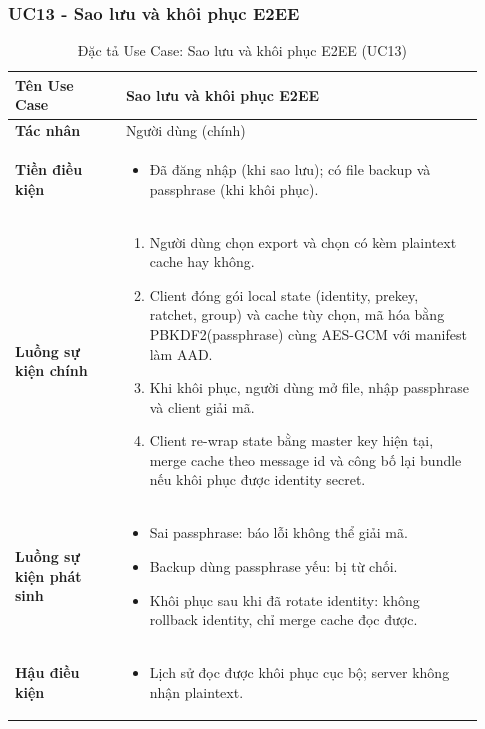 \subsubsection{UC13 - Sao lưu và khôi phục E2EE}

\begin{longtable}{|p{0.22\linewidth}|p{0.71\linewidth}|}
\caption{Đặc tả Use Case: Sao lưu và khôi phục E2EE (UC13)}\label{tab:uc13}\\
\hline
\textbf{Tên Use Case} & Sao lưu và khôi phục E2EE \\ \hline
\textbf{Tác nhân} & Người dùng (chính) \\ \hline
\textbf{Tiền điều kiện} &
\begin{itemize}
  \item Đã đăng nhập (khi sao lưu); có file backup và passphrase (khi khôi phục).
\end{itemize} \\ \hline
\textbf{Luồng sự kiện chính} &
\begin{enumerate}
  \item Người dùng chọn export và chọn có kèm plaintext cache hay không.
  \item Client đóng gói local state (identity, prekey, ratchet, group) và cache tùy chọn, mã hóa bằng PBKDF2(passphrase) cùng AES-GCM với manifest làm AAD.
  \item Khi khôi phục, người dùng mở file, nhập passphrase và client giải mã.
  \item Client re-wrap state bằng master key hiện tại, merge cache theo message id và công bố lại bundle nếu khôi phục được identity secret.
\end{enumerate} \\ \hline
\textbf{Luồng sự kiện phát sinh} &
\begin{itemize}
  \item Sai passphrase: báo lỗi không thể giải mã.
  \item Backup dùng passphrase yếu: bị từ chối.
  \item Khôi phục sau khi đã rotate identity: không rollback identity, chỉ merge cache đọc được.
\end{itemize} \\ \hline
\textbf{Hậu điều kiện} &
\begin{itemize}
  \item Lịch sử đọc được khôi phục cục bộ; server không nhận plaintext.
\end{itemize} \\ \hline
\end{longtable}

